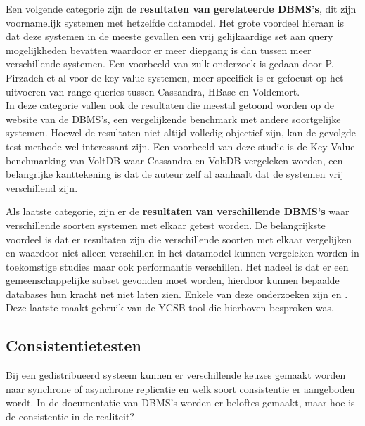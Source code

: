 Een volgende categorie zijn de \textbf{resultaten van gerelateerde DBMS's}, dit zijn voornamelijk systemen met hetzelfde datamodel. Het grote voordeel hieraan is dat deze systemen in de meeste gevallen een vrij gelijkaardige set aan query mogelijkheden bevatten waardoor er meer diepgang is dan tussen meer verschillende systemen. Een voorbeeld van zulk onderzoek is gedaan door P. Pirzadeh et al\cite{pirzadeh2011performance} voor de key-value systemen, meer specifiek is er gefocust op het uitvoeren van range queries tussen Cassandra, HBase en Voldemort.  \\
In deze categorie vallen ook de resultaten die meestal getoond worden op de website van de DBMS's, een vergelijkende benchmark met andere soortgelijke systemen. Hoewel de resultaten niet altijd volledig objectief zijn, kan de gevolgde test methode wel interessant zijn. Een voorbeeld van deze studie is de Key-Value benchmarking van VoltDB\cite{huggkey} waar Cassandra en VoltDB vergeleken worden, een belangrijke kanttekening is dat de auteur zelf al aanhaalt dat de systemen vrij verschillend zijn.

Als laatste categorie, zijn er de \textbf{resultaten van verschillende DBMS's} waar verschillende soorten systemen met elkaar getest worden. De belangrijkste voordeel is dat er resultaten zijn die verschillende soorten met elkaar vergelijken en waardoor niet alleen verschillen in het datamodel kunnen vergeleken worden in toekomstige studies maar ook performantie verschillen. Het nadeel is dat er een gemeenschappelijke subset gevonden moet worden, hierdoor kunnen bepaalde databases hun kracht net niet laten zien. Enkele van deze onderzoeken zijn \cite{tudorica2011comparison} en \cite{rabl2012solving}. Deze laatste maakt gebruik van de YCSB tool die hierboven besproken was. 


\subsection{Consistentietesten}
Bij een gedistribueerd systeem kunnen er verschillende keuzes gemaakt worden naar synchrone of asynchrone replicatie en welk soort consistentie er aangeboden wordt. In de documentatie van DBMS's worden er beloftes gemaakt, maar hoe is de consistentie in de realiteit?

